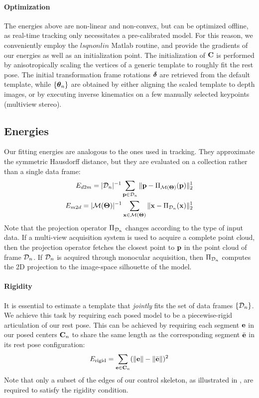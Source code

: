 \paragraph{Optimization}
The energies above are non-linear and non-convex, but can be optimized offline, as real-time tracking only necessitates a pre-calibrated model. For this reason, we conveniently employ the $lsqnonlin$ Matlab routine, and provide the gradients of our energies as well as an initialization point. The initialization of ${\mathbf{C}}$ is performed  by anisotropically scaling the vertices of a generic template to roughly fit the rest pose. The initial transformation frame rotations $\boldsymbol{\delta}$ are retrieved from the default template, while ${\{\boldsymbol{\theta}_n\}}$ are obtained by either aligning the scaled template to depth images, or by executing inverse kinematics on a few manually selected keypoints (multiview stereo).



\subsection{Energies}
Our fitting energies are analogous to the ones used in tracking. They approximate the symmetric Hausdorff distance, but they are evaluated on a collection rather than a single data frame:
% 
\begin{eqnarray}
E_{d2m} = |\mathcal{D}_n|^{-1} \sum_{\mathbf{p} \in \mathcal{D}_n} \| \mathbf{p} - \Pi_{\mathcal{M}(\boldsymbol{\Theta})}(\mathbf{p})\|_2^1 \\
E_{m2d} = |\mathcal{M}(\boldsymbol{\Theta})|^{-1} \sum_{\mathbf{x} \in \mathcal{M}(\boldsymbol{\Theta})} \| \mathbf{x} - \Pi_{\mathcal{D}_n}(\mathbf{x})\|_2^1
\end{eqnarray}
% 
Note that the projection operator $\Pi_{\mathcal{D}_n}$ changes according to the type of input data. If a multi-view acquisition system is used to acquire a complete point cloud, then the projection operator fetches the closest point to $\mathbf{p}$ in the point cloud of frame $\mathcal{D}_n$. If $\mathcal{D}_n$ is acquired through monocular acquisition, then $\Pi_{\mathcal{D}_n}$ computes the 2D projection to the image-space silhouette of the model.

\paragraph{Rigidity}
It is essential to estimate a template that \emph{jointly} fits the set of data frames $\{ \mathcal{D}_n \}$. We achieve this task by requiring each posed model to be a piecewise-rigid articulation of our rest pose. This can be achieved by requiring each segment $\mathbf{e}$ in our posed centers ${\mathbf{C}}_n$ to share the same length as the corresponding segment $\bar{\mathbf{e}}$ in its rest pose configuration:
% 
\begin{equation}
E_{\text{rigid}} = \sum_{\mathbf{e} \in {\mathbf{C}}_n} (\| \mathbf{e} \| - \| \bar{\mathbf{e}} \|)^2
\end{equation}
% 
Note that only a subset of the edges of our control skeleton, as illustrated in , are required to satisfy the rigidity condition.

